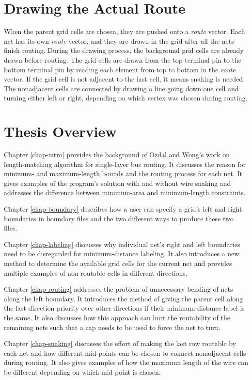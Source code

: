 \section{Drawing the Actual Route}\label{sec-drawroute}
When the parent grid cells are chosen, they are pushed onto a \textit{route} vector. Each net has its own \textit{route} vector, and they are drawn in the grid after all the nets finish routing. During the drawing process, the background grid cells are already drawn before routing. The grid cells are drawn from the top terminal pin to the bottom terminal pin by reading each element from top to bottom in the \textit{route} vector. If the grid cell is not adjacent to the last cell, it means snaking is needed. The nonadjacent cells are connected by drawing a line going down one cell and turning either left or right, depending on which vertex was chosen during routing. 

\section{Thesis Overview}\label{sec-overview}
Chapter \ref{chap-intro} provides the background of Ozdal and Wong's work on length-matching algorithm for single-layer bus routing. It discusses the reason for minimum- and maximum-length bounds and the routing process for each net. It gives examples of the program's solution with and without wire snaking and addresses the difference between minimum-area and minimum-length constraints. 

Chapter \ref{chap-boundary} describes how a user can specify a grid's left and right boundaries in boundary files and the two different ways to produce these two files. 

Chapter \ref{chap-labeling} discusses why individual net's right and left boundaries need to be disregarded for minimum-distance labeling. It also introduces a new method to determine the available grid cells for the current net and provides multiple examples of non-routable cells in different directions. 

Chapter \ref{chap-routing} addresses the problem of unnecessary bending of nets along the left boundary. It introduces the method of giving the parent cell along the last direction priority over other directions if their minimum-distance label is the same. It also discusses how this approach can hurt the routability of the remaining nets such that a cap needs to be used to force the net to turn. 

Chapter \ref{chap-snaking} discusses the effort of making the last row routable by each net and how different mid-points can be chosen to connect nonadjacent cells during routing. It also gives examples of how the maximum length of the wire can be different depending on which mid-point is chosen.  


